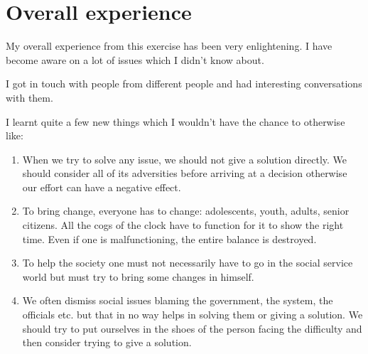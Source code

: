 \chapter{Overall experience}

\vspace{0cm}

My overall experience from this exercise has been very enlightening. I have become aware on a lot of issues which I didn't know about.

I got in touch with people from different people and had interesting conversations with them. 

I learnt quite a few new things which I wouldn't have the chance to otherwise like:
\begin{enumerate}
\item When we try to solve any issue, we should not give a solution directly. We should consider all of its adversities before arriving at a decision otherwise our effort can have a negative effect.
\item To bring change, everyone has to change: adolescents, youth, adults, senior citizens. All the cogs of the clock have to function for it to show the right time. Even if one is malfunctioning, the entire balance is destroyed.
\item To help the society one must not necessarily have to go in the social service world but must try to bring some changes in himself.
\item We often dismiss social issues blaming the government, the system, the officials etc. but that in no way helps in solving them or giving a solution. We should try to put ourselves in the shoes of the person facing the difficulty and then consider trying to give a solution.
\end{enumerate}

